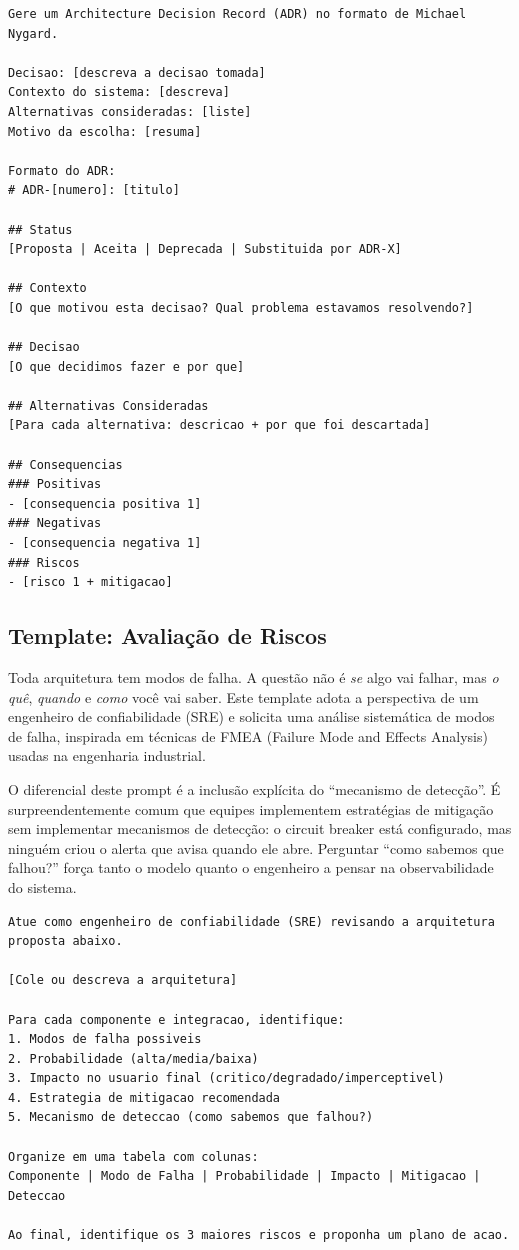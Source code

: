 \begin{lstlisting}[language={}, caption={Prompt para geração de ADR}]
Gere um Architecture Decision Record (ADR) no formato de Michael Nygard.

Decisao: [descreva a decisao tomada]
Contexto do sistema: [descreva]
Alternativas consideradas: [liste]
Motivo da escolha: [resuma]

Formato do ADR:
# ADR-[numero]: [titulo]

## Status
[Proposta | Aceita | Deprecada | Substituida por ADR-X]

## Contexto
[O que motivou esta decisao? Qual problema estavamos resolvendo?]

## Decisao
[O que decidimos fazer e por que]

## Alternativas Consideradas
[Para cada alternativa: descricao + por que foi descartada]

## Consequencias
### Positivas
- [consequencia positiva 1]
### Negativas
- [consequencia negativa 1]
### Riscos
- [risco 1 + mitigacao]
\end{lstlisting}

\subsection{Template: Avaliação de Riscos}

Toda arquitetura tem modos de falha. A questão não é \textit{se} algo vai falhar,
mas \textit{o quê}, \textit{quando} e \textit{como} você vai saber. Este template
adota a perspectiva de um engenheiro de confiabilidade (SRE) e solicita uma
análise sistemática de modos de falha, inspirada em técnicas de FMEA (Failure
Mode and Effects Analysis) usadas na engenharia industrial.

O diferencial deste prompt é a inclusão explícita do ``mecanismo de detecção''. É
surpreendentemente comum que equipes implementem estratégias de mitigação sem
implementar mecanismos de detecção: o circuit breaker está configurado, mas
ninguém criou o alerta que avisa quando ele abre. Perguntar ``como sabemos que
falhou?'' força tanto o modelo quanto o engenheiro a pensar na observabilidade do
sistema.

\begin{lstlisting}[language={}, caption={Prompt para avaliação de riscos arquiteturais}]
Atue como engenheiro de confiabilidade (SRE) revisando a arquitetura
proposta abaixo.

[Cole ou descreva a arquitetura]

Para cada componente e integracao, identifique:
1. Modos de falha possiveis
2. Probabilidade (alta/media/baixa)
3. Impacto no usuario final (critico/degradado/imperceptivel)
4. Estrategia de mitigacao recomendada
5. Mecanismo de deteccao (como sabemos que falhou?)

Organize em uma tabela com colunas:
Componente | Modo de Falha | Probabilidade | Impacto | Mitigacao | Deteccao

Ao final, identifique os 3 maiores riscos e proponha um plano de acao.
\end{lstlisting}

